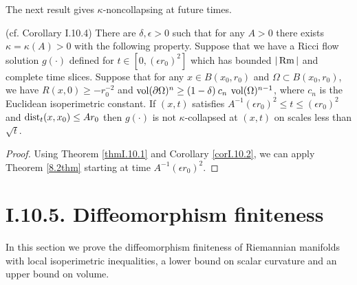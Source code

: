 The next result gives $\kappa$-noncollapsing at future times.

\begin{corollary}
  \label{cor:kl-noncollapsing-at-future-times-existence-kappa-solutions}
 (cf. Corollary I.10.4)
There are $\delta,\epsilon > 0$ such that for any $A > 0$ there exists
$\kappa = \kappa(A) > 0$ with the following property.
Suppose that we have a Ricci flow solution
$g(\cdot)$ defined for $t \in [0, (\epsilon r_0)^2]$ which
has bounded $|\operatorname{Rm}|$ and complete time slices. Suppose that
for any $x \in B(x_0, r_0)$ and $\Omega \subset B(x_0, r_0)$,
we have $R(x,0) \ge - r_0^{-2}$ and $\operatorname{vol}(\partial \Omega)^n
\ge (1-\delta) \: c_n \: \operatorname{vol}(\Omega)^{n-1}$, where $c_n$ is the
Euclidean isoperimetric constant. If $(x,t)$ satisfies
$A^{-1} (\epsilon r_0)^2 \le t \le (\epsilon r_0)^2$ and
$\operatorname{dist}_t(x, x_0) \le A r_0$ then $g(\cdot)$ is not
$\kappa$-collapsed at $(x,t)$ on scales less than $\sqrt{t}$.
\end{corollary}
\begin{proof}
Using Theorem \ref{thmI.10.1} and
Corollary \ref{corI.10.2}, we can apply
Theorem \ref{8.2thm} starting at time $A^{-1} (\epsilon r_0)^2$.
\end{proof}

\section{I.10.5. Diffeomorphism finiteness}
\label{I.10.5}

In this section we prove the diffeomorphism finiteness of Riemannian
manifolds with local isoperimetric inequalities, a lower bound on
scalar curvature and an upper bound on volume.

